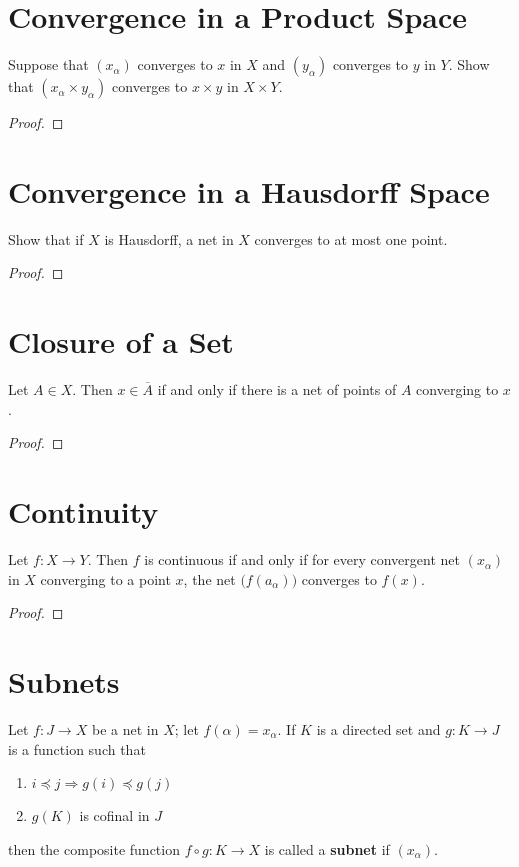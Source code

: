 \documentclass[12pt]{article}
\begin{document}
\section{Convergence in a Product Space}
Suppose that $(x_\alpha)$ converges to $x$ in $X$ and $(y_\alpha)$ converges to $y$ in $Y$. Show that $(x_\alpha \times y_\alpha)$ converges to $x \times y$ in $X \times Y$.
\begin{proof}
\end{proof}

\section{Convergence in a Hausdorff Space}
Show that if $X$ is Hausdorff, a net in $X$ converges to at most one point.
\begin{proof}
\end{proof}

\section{Closure of a Set}
\begin{thm}
	Let $A \in X$. Then $x \in \overline A$ if and only if there is a net of points of $A$ converging to $x$.
\end{thm}
\begin{proof}
\end{proof}

\section{Continuity}
\begin{thm}
	Let $f: X \to Y$. Then $f$ is continuous if and only if for every convergent net $(x_\alpha)$ in $X$ converging to a point $x$, the net $\big(f(a_\alpha)\big)$ converges to $f(x)$.
\end{thm}
\begin{proof}
\end{proof}

\section{Subnets}
\begin{defn}
	Let $f: J \to X$ be a net in $X$; let $f(\alpha) = x_\alpha$. If $K$ is a directed set and $g:K \to J$ is a function such that
	\begin{enumerate}
		\item $i \preceq j \Rightarrow g(i) \preceq g(j)$
		\item $g(K)$ is cofinal in $J$
	\end{enumerate}
	then the composite function $f \circ g : K \to X$ is called a \textbf{subnet} if $(x_\alpha)$.
\end{defn}
\end{document}
